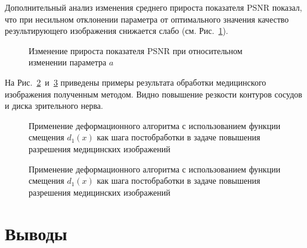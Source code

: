 Дополнительный анализ изменения среднего прироста показателя PSNR показал, что при несильном отклонении параметра от оптимального значения качество результирующего изображения снижается слабо (см. Рис.~\ref{fig:warping-isnr-change}).

\begin{figure}[ht]
	\caption{Изменение прироста показателя PSNR при относительном изменении параметра $a$}
	\label{fig:warping-isnr-change}
\end{figure}

На Рис.~\ref{fig:warping-eye}~и~\ref{fig:warping-eye2} приведены примеры результата обработки медицинского изображения полученным методом. Видно повышение резкости контуров сосудов и диска зрительного нерва.

\begin{figure}[ht]
	\caption{Применение деформационного алгоритма с использованием функции смещения $d_1\left(x\right)$ как шага постобработки в задаче повышения разрешения медицинских изображений}
	\label{fig:warping-eye}
\end{figure}

\begin{figure}[ht]
	\caption{Применение деформационного алгоритма с использованием функции смещения $d_1\left(x\right)$ как шага постобработки в задаче повышения разрешения медицинских изображений}
	\label{fig:warping-eye2}
\end{figure}

\section{Выводы} 


